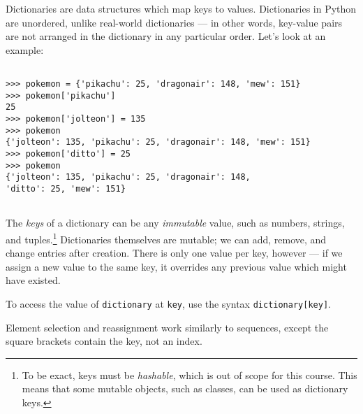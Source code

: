 
Dictionaries are data structures which map keys to values.
Dictionaries in Python are unordered, unlike real-world dictionaries --- in
other words, key-value pairs are not arranged in the dictionary in any
particular order. Let's look at an example:

\begin{lstlisting}

>>> pokemon = {'pikachu': 25, 'dragonair': 148, 'mew': 151}
>>> pokemon['pikachu']
25
>>> pokemon['jolteon'] = 135
>>> pokemon
{'jolteon': 135, 'pikachu': 25, 'dragonair': 148, 'mew': 151}
>>> pokemon['ditto'] = 25
>>> pokemon
{'jolteon': 135, 'pikachu': 25, 'dragonair': 148,
'ditto': 25, 'mew': 151}


\end{lstlisting}
\vspace{5}
The {\it keys} of a dictionary can be any {\it immutable} value, such as
numbers, strings, and tuples.\footnote{To be exact, keys must be {\it
hashable}, which is out of scope for this course. This means that some
mutable objects, such as classes, can be used as dictionary keys.}
Dictionaries themselves are mutable; we can add,
remove, and change entries after creation. There is only one value per key,
however --- if we assign a new value to the same key, it overrides any previous
value which might have existed.

To access the value of {\tt dictionary} at {\tt key}, use the syntax
{\tt dictionary[key]}.

Element selection and reassignment work similarly to sequences, except the
square brackets contain the key, not an index.
